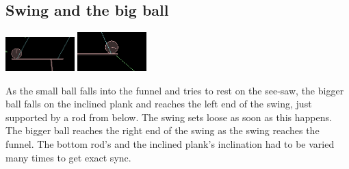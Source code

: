 \documentclass[11pt]{article}
\begin{document}
\subsection{Swing and the big ball}
\begin{center}
\includegraphics[width=0.2\textwidth,height=0.1\textheight]{img/swing1} 
\hspace{2em}
\includegraphics[width=0.2\textwidth,height=0.1\textheight]{img/swing2}
\end{center}
As the small ball falls into the funnel and tries to rest on the see-saw, the bigger ball falls on the inclined plank and reaches the left end of the swing, just supported by a rod from below. The swing sets loose as soon as this happens. The bigger ball reaches the right end of the swing as the swing reaches the funnel. The bottom rod's and the inclined plank's inclination had to be varied many times to get exact sync.
\end{document}
